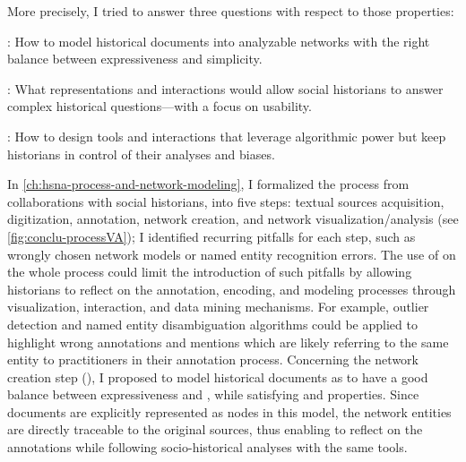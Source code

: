 More precisely, I tried to answer three questions with respect to those properties:
\begin{description}
    \item \qone:  How to model historical documents into analyzable networks with the right balance between expressiveness and simplicity.
    \item \qtwo: What representations and interactions would allow social historians to answer complex historical questions---with a focus on usability.
    \item \qthree: How to design \va tools and interactions that leverage algorithmic power but keep historians in control of their analyses and biases.
\end{description}

In \autoref{ch:hsna-process-and-network-modeling}, I formalized the \hsna process from collaborations with social historians, into five steps: textual sources acquisition, digitization, annotation, network creation, and network visualization/analysis (see \autoref{fig:conclu-processVA}); I identified recurring pitfalls for each step, such as wrongly chosen network models or named entity recognition errors.
The use of \va on the whole process could limit the introduction of such pitfalls by allowing historians to reflect on the annotation, encoding, and modeling processes through visualization, interaction, and data mining mechanisms.
For example, outlier detection and named entity disambiguation algorithms could be applied to highlight wrong annotations and mentions which are likely referring to the same entity to practitioners in their annotation process.
Concerning the network creation step (\qone), I proposed to model historical documents as \modelplural to have a good balance between expressiveness and \simplicity, while satisfying \traceability and \reality properties.
Since documents are explicitly represented as nodes in this model, the network entities are directly traceable to the original sources, thus enabling to reflect on the annotations while following socio-historical analyses with the same tools.

